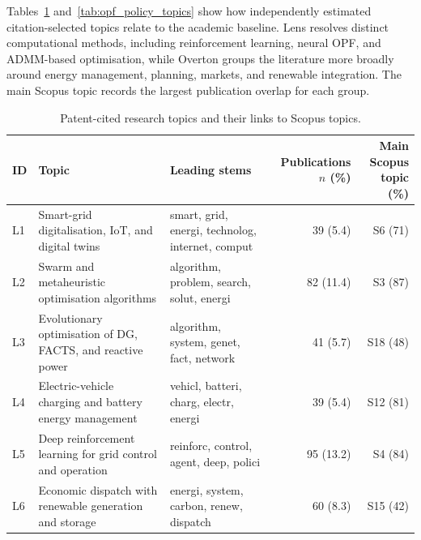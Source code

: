 \documentclass[a4paper,fleqn]{cas-sc}
\begin{document}
    Tables~\ref{tab:opf_cited_topics} and~\ref{tab:opf_policy_topics} show how independently estimated citation-selected topics relate to the academic baseline. Lens resolves distinct computational methods, including reinforcement learning, neural OPF, and ADMM-based optimisation, while Overton groups the literature more broadly around energy management, planning, markets, and renewable integration. The main Scopus topic records the largest publication overlap for each group.
    
    \begin{table}[p]
    \centering
    \caption{Patent-cited research topics and their links to Scopus topics.}
    \label{tab:opf_cited_topics}
    \scriptsize
    \setlength{\tabcolsep}{3pt}
    \renewcommand{\arraystretch}{1.10}
    \begin{tabularx}{\textwidth}{
    l
    >{\raggedright\arraybackslash}X
    >{\raggedright\arraybackslash}X
    rr}
    \toprule
    ID & Topic & Leading stems
    & \shortstack{Publications\\$n$ (\%)}
    & \shortstack{Main Scopus\\topic (\%)} \\
    \midrule
    
    L1 & Smart-grid digitalisation, IoT, and digital twins
    & smart, grid, energi, technolog, internet, comput
    & 39 (5.4) & S6 (71) \\
    
    L2 & Swarm and metaheuristic optimisation algorithms
    & algorithm, problem, search, solut, energi
    & 82 (11.4) & S3 (87) \\
    
    L3 & Evolutionary optimisation of DG, FACTS, and reactive power
    & algorithm, system, genet, fact, network
    & 41 (5.7) & S18 (48) \\
    
    L4 & Electric-vehicle charging and battery energy management
    & vehicl, batteri, charg, electr, energi
    & 39 (5.4) & S12 (81) \\
    
    L5 & Deep reinforcement learning for grid control and operation
    & reinforc, control, agent, deep, polici
    & 95 (13.2) & S4 (84) \\
    
    L6 & Economic dispatch with renewable generation and storage
    & energi, system, carbon, renew, dispatch
    & 60 (8.3) & S15 (42) \\
    

\end{tabularx}
\end{table}
\end{document}
